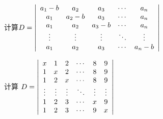\begin{frame}
  
    \begin{li}[2008－2009第一学期]
      计算$
      D=\left|
      \begin{array}{ccccc}
        a_1-b&a_2&a_3&\cdots&a_n\\
        a_1&a_2-b&a_3&\cdots&a_n\\
        a_1&a_2&a_3-b&\cdots&a_n\\
        \vdots&\vdots&\vdots&\ddots&\vdots\\
        a_1&a_2&a_3&\cdots&a_n-b
      \end{array}
      \right|
      $
    \end{li}
  
\end{frame}

\begin{frame}
  
    \begin{li}[2011－2012第二学期]
      计算
      $
      D=\left|
      \begin{array}{cccccc}
        x&1&2&\cdots&8&9\\
        1&x&2&\cdots&8&9\\
        1&2&x&\cdots&8&9\\
        \vdots&\vdots&\vdots&\ddots&\vdots&\vdots\\
        1&2&3&\cdots&x&9\\
        1&2&3&\cdots&9&x
      \end{array}
      \right|
      $
    \end{li}
    

\end{frame}
